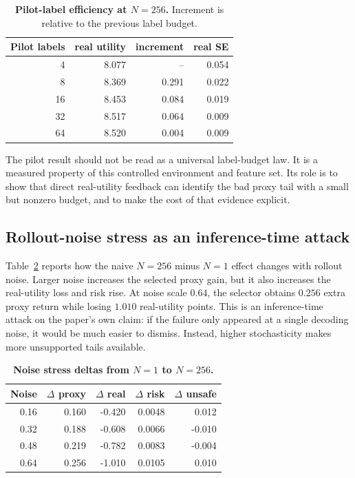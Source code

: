 \begin{table}[t]
\centering
\small
\caption{\textbf{Pilot-label efficiency at $N=256$.} Increment is relative to the previous label budget.}
\label{tab:pilot-efficiency}
\begin{tabular}{rrrr}
\toprule
Pilot labels & real utility & increment & real SE \\
\midrule
4 & 8.077 & -- & 0.054 \\
8 & 8.369 & 0.291 & 0.022 \\
16 & 8.453 & 0.084 & 0.019 \\
32 & 8.517 & 0.064 & 0.009 \\
64 & 8.520 & 0.004 & 0.009 \\
\bottomrule
\end{tabular}
\end{table}

The pilot result should not be read as a universal label-budget law. It is a measured property of this controlled environment and feature set. Its role is to show that direct real-utility feedback can identify the bad proxy tail with a small but nonzero budget, and to make the cost of that evidence explicit.

\subsection{Rollout-noise stress as an inference-time attack}

Table~\ref{tab:noise-deltas} reports how the naive $N=256$ minus $N=1$ effect changes with rollout noise. Larger noise increases the selected proxy gain, but it also increases the real-utility loss and risk rise. At noise scale $0.64$, the selector obtains $0.256$ extra proxy return while losing $1.010$ real-utility points. This is an inference-time attack on the paper's own claim: if the failure only appeared at a single decoding noise, it would be much easier to dismiss. Instead, higher stochasticity makes more unsupported tails available.

\begin{table}[t]
\centering
\small
\caption{\textbf{Noise stress deltas from $N=1$ to $N=256$.}}
\label{tab:noise-deltas}
\begin{tabular}{rrrrr}
\toprule
Noise & $\Delta$ proxy & $\Delta$ real & $\Delta$ risk & $\Delta$ unsafe \\
\midrule
0.16 & 0.160 & -0.420 & 0.0048 & 0.012 \\
0.32 & 0.188 & -0.608 & 0.0066 & -0.010 \\
0.48 & 0.219 & -0.782 & 0.0083 & -0.004 \\
0.64 & 0.256 & -1.010 & 0.0105 & 0.010 \\
\bottomrule
\end{tabular}
\end{table}

